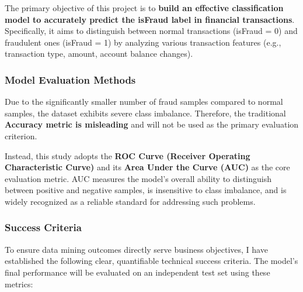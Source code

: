 \documentclass[sigplan,screen]{acmart}
\begin{document}
The primary objective of this project is to \textbf{build an effective classification model to accurately predict the isFraud label in financial transactions}. Specifically, it aims to distinguish between normal transactions (isFraud = 0) and fraudulent ones (isFraud = 1) by analyzing various transaction features (e.g., transaction type, amount, account balance changes).
    
\subsubsection{Model Evaluation Methods}
    
Due to the significantly smaller number of fraud samples compared to normal samples, the dataset exhibits severe class imbalance. Therefore, the traditional \textbf{Accuracy metric is misleading} and will not be used as the primary evaluation criterion.

Instead, this study adopts the \textbf{ROC Curve (Receiver Operating Characteristic Curve)} and its \textbf{Area Under the Curve (AUC)} as the core evaluation metric. AUC measures the model's overall ability to distinguish between positive and negative samples, is insensitive to class imbalance, and is widely recognized as a reliable standard for addressing such problems.
    
\subsubsection{Success Criteria}
    
To ensure data mining outcomes directly serve business objectives, I have established the following clear, quantifiable technical success criteria. The model's final performance will be evaluated on an independent test set using these metrics:
\end{document}
